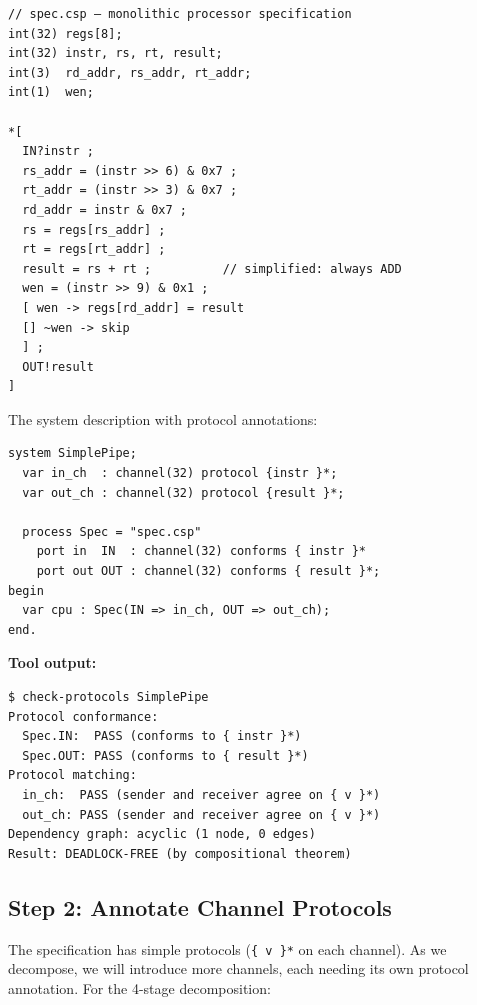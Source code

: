 \documentclass[11pt]{article}
\begin{document}
\begin{Verbatim}[samepage=true]
// spec.csp — monolithic processor specification
int(32) regs[8];
int(32) instr, rs, rt, result;
int(3)  rd_addr, rs_addr, rt_addr;
int(1)  wen;

*[
  IN?instr ;
  rs_addr = (instr >> 6) & 0x7 ;
  rt_addr = (instr >> 3) & 0x7 ;
  rd_addr = instr & 0x7 ;
  rs = regs[rs_addr] ;
  rt = regs[rt_addr] ;
  result = rs + rt ;          // simplified: always ADD
  wen = (instr >> 9) & 0x1 ;
  [ wen -> regs[rd_addr] = result
  [] ~wen -> skip
  ] ;
  OUT!result
]
\end{Verbatim}

The system description with protocol annotations:

\begin{Verbatim}[samepage=true]
system SimplePipe;
  var in_ch  : channel(32) protocol {instr }*;
  var out_ch : channel(32) protocol {result }*;

  process Spec = "spec.csp"
    port in  IN  : channel(32) conforms { instr }*
    port out OUT : channel(32) conforms { result }*;
begin
  var cpu : Spec(IN => in_ch, OUT => out_ch);
end.
\end{Verbatim}

\textbf{Tool output:}
\begin{Verbatim}[samepage=true]
$ check-protocols SimplePipe
Protocol conformance:
  Spec.IN:  PASS (conforms to { instr }*)
  Spec.OUT: PASS (conforms to { result }*)
Protocol matching:
  in_ch:  PASS (sender and receiver agree on { v }*)
  out_ch: PASS (sender and receiver agree on { v }*)
Dependency graph: acyclic (1 node, 0 edges)
Result: DEADLOCK-FREE (by compositional theorem)
\end{Verbatim}

\subsection{Step 2: Annotate Channel Protocols}

The specification has simple protocols (\texttt{\{ v \}*} on each
channel).  As we decompose, we will introduce more channels, each
needing its own protocol annotation.  For the 4-stage decomposition:
\end{document}
